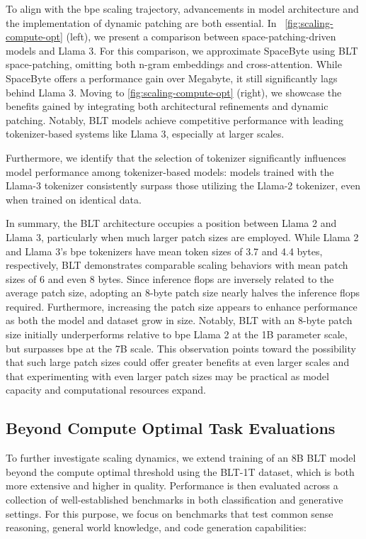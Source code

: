 To align with the bpe scaling trajectory, advancements in model architecture and the implementation of dynamic patching are both essential. In ~\autoref{fig:scaling-compute-opt} (left), we present a comparison between space-patching-driven models and Llama 3. For this comparison, we approximate SpaceByte \citep{slagle2024spacebyte} using {\textsc BLT} space-patching, omitting both n-gram embeddings and cross-attention. While SpaceByte offers a performance gain over Megabyte, it still significantly lags behind Llama 3. Moving to \autoref{fig:scaling-compute-opt} (right), we showcase the benefits gained by integrating both architectural refinements and dynamic patching. Notably, {\textsc BLT} models achieve competitive performance with leading tokenizer-based systems like Llama 3, especially at larger scales.

Furthermore, we identify that the selection of tokenizer significantly influences model performance among tokenizer-based models: models trained with the Llama-3 tokenizer consistently surpass those utilizing the Llama-2 tokenizer, even when trained on identical data.

In summary, the {\textsc BLT} architecture occupies a position between Llama 2 and Llama 3, particularly when much larger patch sizes are employed. While Llama 2 and Llama 3's bpe tokenizers have mean token sizes of 3.7 and 4.4 bytes, respectively, {\textsc BLT} demonstrates comparable scaling behaviors with mean patch sizes of 6 and even 8 bytes. Since inference flops are inversely related to the average patch size, adopting an 8-byte patch size nearly halves the inference flops required. Furthermore, increasing the patch size appears to enhance performance as both the model and dataset grow in size. Notably, {\textsc BLT} with an 8-byte patch size initially underperforms relative to bpe Llama 2 at the 1B parameter scale, but surpasses bpe at the 7B scale. This observation points toward the possibility that such large patch sizes could offer greater benefits at even larger scales and that experimenting with even larger patch sizes may be practical as model capacity and computational resources expand.

\subsection{Beyond Compute Optimal Task Evaluations}
\label{section:evals}
To further investigate scaling dynamics, we extend training of an 8B {\textsc BLT} model beyond the compute optimal threshold using the {\textsc BLT}-1T dataset, which is both more extensive and higher in quality. Performance is then evaluated across a collection of well-established benchmarks in both classification and generative settings. For this purpose, we focus on benchmarks that test common sense reasoning, general world knowledge, and code generation capabilities:
